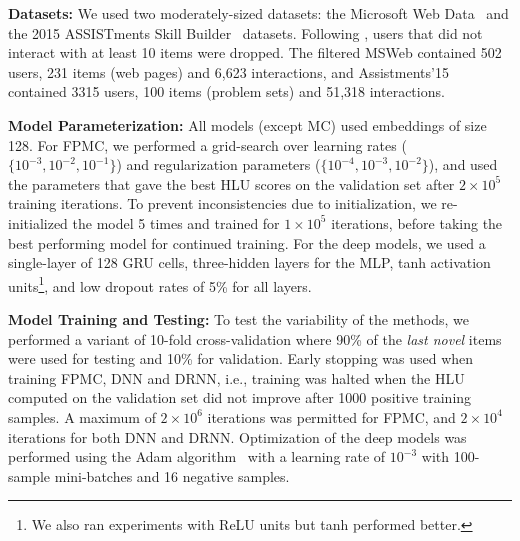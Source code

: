 \documentclass{sig-alternate-05-2015}
\begin{document}
\vspace{2mm}
\noindent\textbf{Datasets:} We used two moderately-sized datasets: the Microsoft Web Data~\cite{Breese1998} and the 2015 ASSISTments Skill Builder~\cite{Assistmentsdata} datasets. Following \cite{Rendle2010}, users that did not interact with at least 10 items were dropped. The filtered MSWeb contained 502 users, 231 items (web pages) and 6,623 interactions, and  Assistments'15 contained 3315 users, 100 items (problem sets) and 51,318 interactions. 

\vspace{2mm}
\noindent\textbf{Model Parameterization:} All models (except MC) used embeddings of size 128. For FPMC, we performed a grid-search over learning rates ($\{10^{-3},10^{-2},10^{-1}\}$) and regularization parameters ($\{10^{-4},10^{-3},10^{-2}\}$), and used the parameters that gave the best HLU scores on the validation set after $2\times10^5$ training iterations. To prevent inconsistencies due to initialization, we re-initialized the model 5 times and trained for $1\times10^5$ iterations, before taking the best performing model for continued training. For the deep models, we used a single-layer of 128 GRU cells, three-hidden layers for the MLP, tanh activation units\footnote{We also ran experiments with ReLU units but tanh performed better.}, and low dropout rates of 5\% for all layers. 

\vspace{2mm}
\noindent\textbf{Model Training and Testing:} To test the variability of the methods, we performed a variant of 10-fold cross-validation where 90\% of the \emph{last novel} items were used for testing and 10\% for validation. Early stopping was used when training FPMC, DNN and DRNN, i.e., training was halted when the HLU computed on the validation set did not improve after 1000 positive training samples. A maximum of $2\times 10^6$ iterations was permitted for FPMC, and $2\times 10^4$ iterations for both DNN and DRNN. Optimization of the deep models was performed using the Adam algorithm~\cite{Kingma2015} with a learning rate of $10^{-3}$ with 100-sample mini-batches and 16 negative samples.
\end{document}
